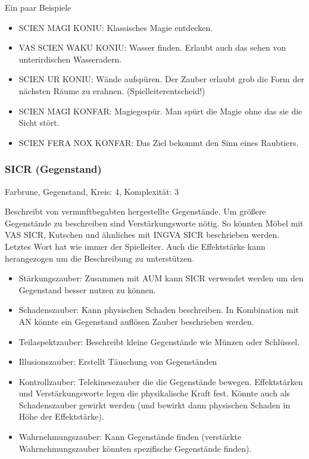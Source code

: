 \documentclass{article}
\begin{document}
Ein paar Beispiele

\begin{itemize}
\item SCIEN MAGI KONIU: Klassisches Magie entdecken.
\item VAS SCIEN WAKU KONIU: Wasser finden. Erlaubt auch das sehen von unterirdischen Wasseradern.
\item SCIEN UR KONIU: Wände aufspüren. Der Zauber erlaubt grob die Form der nächsten Räume zu erahnen. (Spielleiterentscheid!)
\item SCIEN MAGI KONFAR: Magiegespür. Man spürt die Magie ohne das sie die Sicht stört.
\item SCIEN FERA NOX KONFAR: Das Ziel bekommt den Sinn eines Raubtiers.
\end{itemize}

\subsubsection{SICR (Gegenstand)}

Farbrune, Gegenstand, Kreis: 4, Komplexität: 3

Beschreibt von vernunftbegabten hergestellte Gegenstände. Um größere Gegenstände zu beschreiben sind
Verstärkungsworte nötig. So könnten Möbel mit VAS SICR, Kutschen und ähnliches mit INGVA SICR beschrieben werden.
Letztes Wort hat wie immer der Spielleiter. Auch die Effektstärke kann herangezogen um die Beschreibung zu
unterstützen.

\begin{itemize}
\item Stärkungszauber: Zusammen mit AUM kann SICR verwendet werden um den Gegenstand besser nutzen zu können.
\item Schadenszauber: Kann physischen Schaden beschreiben. In Kombination mit AN könnte ein Gegenstand auflösen Zauber beschrieben werden.
\item Teilaspektzauber: Beschreibt kleine Gegenstände wie Münzen oder Schlüssel.
\item Illusionszauber: Erstellt Täuschung von Gegenständen
\item Kontrollzauber: Telekinesezauber die die Gegenstände bewegen. Effektstärken und Verstärkungsworte legen die physikalische Kraft fest. Könnte auch als Schadenszauber gewirkt werden (und bewirkt dann physischen Schaden in Höhe der Effektstärke).
\item Wahrnehmungszauber: Kann Gegenstände finden (verstärkte Wahrnehmungszauber könnten spezifische Gegenstände finden).
\end{itemize}
\end{document}
